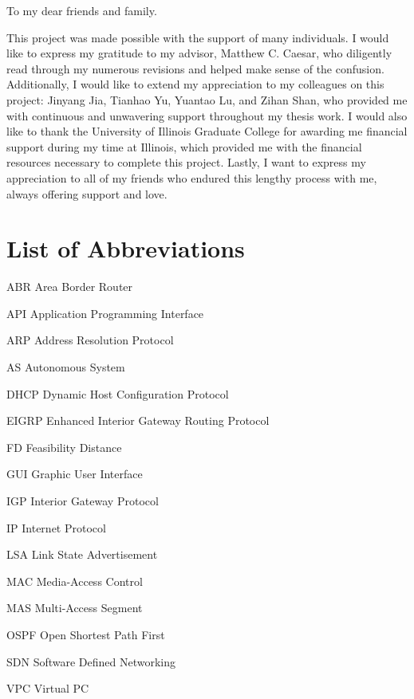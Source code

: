 \documentclass{uiucthesis2021}
\begin{document}
\begin{dedication}
To my dear friends and family.
\end{dedication}

\begin{acknowledgments}
\par This project was made possible with the support of many individuals. I would like to express my gratitude to my advisor, Matthew C. Caesar, who diligently read through my numerous revisions and helped make sense of the confusion. Additionally, I would like to extend my appreciation to my colleagues on this project: Jinyang Jia, Tianhao Yu, Yuantao Lu, and Zihan Shan, who provided me with continuous and unwavering support throughout my thesis work. I would also like to thank the University of Illinois Graduate College for awarding me financial support during my time at Illinois, which provided me with the financial resources necessary to complete this project. Lastly, I want to express my appreciation to all of my friends who endured this lengthy process with me, always offering support and love.
\end{acknowledgments}

{
    \hypersetup{linkcolor=black}  %
    \tableofcontents
}

\chapter{List of Abbreviations}

\begin{abbrevlist}
\item[ABR] Area Border Router
\item[API] Application Programming Interface
\item[ARP] Address Resolution Protocol 
\item[AS] Autonomous System
\item[DHCP] Dynamic Host Configuration Protocol
\item[EIGRP] Enhanced Interior Gateway Routing Protocol
\item[FD] Feasibility Distance
\item[GUI] Graphic User Interface
\item[IGP] Interior Gateway Protocol
\item[IP] Internet Protocol
\item[LSA] Link State Advertisement
\item[MAC] Media-Access Control
\item[MAS] Multi-Access Segment
\item[OSPF] Open Shortest Path First 
\item[SDN] Software Defined Networking
\item[VPC] Virtual PC
\end{abbrevlist}
\end{document}
